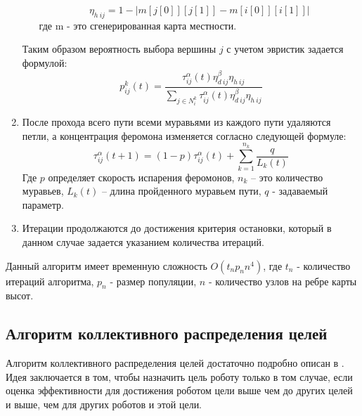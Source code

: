\documentclass{article}
\numberwithin{equation}{section}
\begin{document}
\begin{enumerate}
\begin{itemize}
						\[
							\eta_{h\ ij} = 1 - |m[j[0]][j[1]] - m[i[0]][i[1]]|
						\]
						где m - это сгенерированная карта местности.
				\end{itemize}
				Таким образом вероятность выбора вершины $j$ с учетом эвристик задается формулой:
				\[
					p_{ij}^{k}(t) = \frac{\tau_{ij}^{\alpha}(t)\eta_{d\ ij}^{\beta}\eta_{h\ ij}}{\sum\limits_{j \in N_{i}^{k}}\tau_{ij}^{\alpha}(t)\eta_{d\ ij}^{\beta}\eta_{h\ ij}}
				\]
				\item После прохода всего пути всеми муравьями из каждого пути удаляются петли, а концентрация феромона изменяется согласно следующей формуле:
				\[
					\tau_{ij}^{\alpha}(t+1) = (1 - p)\tau_{ij}^{\alpha}(t) + \sum\limits_{k = 1}^{n_{k}}\frac{q}{L_{k}(t)}
				\]
				Где $p$ определяет скорость испарения феромонов, $n_{k}$ -- это количество муравьев, $L_{k}(t)$ -- длина пройденного муравьем пути, $q$ - задаваемый параметр.
				\item Итерации продолжаются до достижения критерия остановки, который в данном случае задается указанием количества итераций.
			\end{enumerate}

		Данный алгоритм имеет временную сложность $O(t_{n} p_{n} n^{4})$, где $t_{n}$ - количество итераций алгоритма, $p_{n}$ - размер популяции, $n$ - количество узлов на ребре карты высот.

		\subsection{Алгоритм коллективного распределения целей}

		Алгоритм коллективного распределения целей достаточно подробно описан в \cite{plan}. Идея заключается в том, чтобы назначить цель роботу только в том случае, если оценка эффективности для достижения роботом цели выше чем до других целей и выше, чем для других роботов и этой цели.
\end{document}
